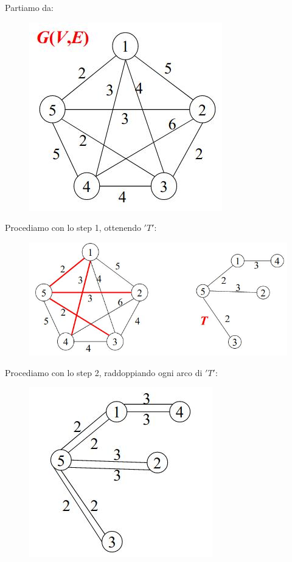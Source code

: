 												      	\begin{esempio}
												      		Partiamo da:
												      		\begin{figure}[h!]
												      			\centering
												      			\includegraphics[scale = 0.4]{img/ch1.jpg}
												      		\end{figure}
												      		Procediamo con lo step 1, ottenendo $ 'T' $:
												      		\begin{figure}[h!]
												      			\centering
												      			\includegraphics[scale = 0.4]{img/ch2.jpg}
												      		\end{figure}
												      		Procediamo con lo step 2, raddoppiando ogni arco di $ 'T' $:
												      		\begin{figure}[h!]
												      			\centering
												      			\includegraphics[scale = 0.4]{img/ch3.jpg}

\end{figure}
\end{esempio}
